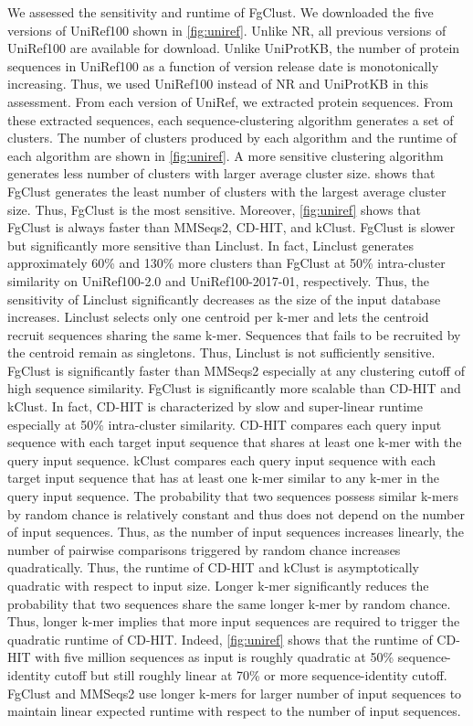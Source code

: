 \documentclass[11pt,letterpaper]{article}
\begin{document}
We assessed the sensitivity and runtime of FgClust.
We downloaded the five versions of UniRef100 \citep{suzek2007uniref} shown in \cref{fig:uniref}.
Unlike NR, all previous versions of UniRef100 are available for download.
Unlike UniProtKB, the number of protein sequences in UniRef100 as a function of version release date is monotonically increasing.
Thus, we used UniRef100 instead of NR and UniProtKB in this assessment.
From each version of UniRef, we extracted protein sequences.
From these extracted sequences, each sequence-clustering algorithm generates a set of clusters.
The number of clusters produced by each algorithm and the runtime of each algorithm are shown in \cref{fig:uniref}.
A more sensitive clustering algorithm generates less number of clusters with larger average cluster size.
 shows that FgClust generates the least number of clusters with the largest average cluster size.
Thus, FgClust is the most sensitive.
Moreover, \cref{fig:uniref} shows that FgClust is always faster than MMSeqs2, CD-HIT, and kClust.
FgClust is slower but significantly more sensitive than Linclust.
In fact, Linclust generates approximately 60\% and 130\% more clusters than FgClust at 50\% intra-cluster similarity on UniRef100-2.0 and UniRef100-2017-01, respectively.
Thus, the sensitivity of Linclust significantly decreases as the size of the input database increases. 
Linclust selects only one centroid per k-mer and lets the centroid recruit sequences sharing the same k-mer.
Sequences that fails to be recruited by the centroid remain as singletons.
Thus, Linclust is not sufficiently sensitive.
FgClust is significantly faster than MMSeqs2 especially at any clustering cutoff of high sequence similarity.
FgClust is significantly more scalable than CD-HIT and kClust. 
In fact, CD-HIT is characterized by slow and super-linear runtime especially at 50\% intra-cluster similarity.
CD-HIT compares each query input sequence with each target input sequence that shares at least one k-mer with the query input sequence.
kClust compares each query input sequence with each target input sequence that has at least one k-mer similar to any k-mer in the query input sequence.
The probability that two sequences possess similar k-mers by random chance is relatively constant and thus does not depend on the number of input sequences.
Thus, as the number of input sequences increases linearly, the number of pairwise comparisons triggered by random chance increases quadratically.
Thus, the runtime of CD-HIT and kClust is asymptotically quadratic with respect to input size.
Longer k-mer significantly reduces the probability that two sequences share the same longer k-mer by random chance.
Thus, longer k-mer implies that more input sequences are required to trigger the quadratic runtime of CD-HIT.
Indeed, \cref{fig:uniref} shows that the runtime of CD-HIT with five million sequences as input is roughly quadratic at 50\% sequence-identity cutoff but still roughly linear at 70\% or more sequence-identity cutoff.
FgClust and MMSeqs2 use longer k-mers for larger number of input sequences to maintain linear expected runtime with respect to the number of input sequences.
\end{document}
